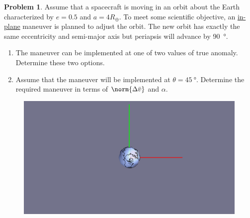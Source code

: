 \documentclass[10pt]{article}
\theoremstyle{definition}
\newtheorem{prob}{Problem}[section]
\newenvironment{subprob}%
{\renewcommand{\theenumi}{\alph{enumi}}\renewcommand{\labelenumi}{(\theenumi)}\begin{enumerate}}%
{\end{enumerate}}%
\begin{document}
\begin{prob}
    Assume that a spacecraft is moving in an orbit about the Earth characterized by \( e = 0.5\) and \( a = 4 R_\oplus\).
    To meet some scientific objective, an \underline{in-plane} maneuver is planned to adjust the orbit.
    The new orbit has exactly the same eccentricity and semi-major axis but periapsis will advance by \SI{90}{\degree}.
    \begin{subprob}
        \item The maneuver can be implemented at one of two values of true anomaly. 
            Determine these two options.
        \item Assume that the maneuver will be implemented at \( \theta = \SI{45}{\degree}\).
            Determine the required maneuver in terms of \( \norm{\Delta \bar v} \) and \(\alpha\).
    \end{subprob}
    \vspace*{9cm} 
    \begin{figure}[hb]
        \centering
        \includegraphics[width=\textwidth]{prob2.png}
    \end{figure}
\end{prob}
\end{document}
